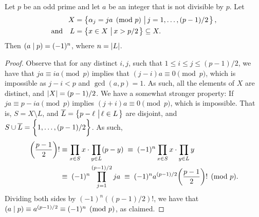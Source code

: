 \begin{lemma}
    Let $p$ be an odd prime and let $a$ be an integer that is not
    divisible by $p$. Let
    \begin{align*}
        X &= \left\{ { \alpha_ j = ja
           \pmod{p}\,\left|\, {j=1,\ldots, (p-1)/2} \bigr.\right.} \right\},\\
        \text{and}\quad
        L &= { \left\{ { x \in X \,\left|\, { x > p/2} \bigr.\right.} \right\} } \subseteq X.
    \end{align*}
    Then $\left( \displaystyle {a}\mid{p} \right) = (-1)^n$, where $n = \left| {L} \right|$.
\end{lemma}
\begin{proof}
    Observe that for any distinct $i,j$, such that $1\leq i\leq j\leq
    (p-1)/2$, we have that $ja \equiv ia \pmod{p}$ implies that $(j-i)
    a \equiv 0 \pmod{p}$, which is impossible as $j-i < p$ and
    $\gcd(a,p) = 1$. As such, all the elements of $X$ are distinct,
    and $\left| {X} \right| = (p-1)/2$. We have a somewhat stronger property:
    If $ja \equiv p - ia \pmod{p}$ implies $(j+i)a \equiv 0 \pmod{p}$,
    which is impossible. That is, $S =X \setminus L$, and
    $\overline{L} = \left\{ { p -\ell \,\left|\, {\ell \in L} \bigr.\right.} \right\}$ are disjoint, and
    $S \cup \overline{L} = \left\{ {1,\ldots, (p-1)/2\biggl.} \right\}$. As such,
    \begin{align*} 
        \pth{\frac{p-1}{2}}!%
        &\equiv%
        \prod_{x \in S} x \cdot \prod_{y \in L} (p-y)%
        \;\equiv\;%
        (-1)^n \prod_{x \in S} x \cdot \prod_{y \in L} y\\
        &\equiv\;%
        (-1)^n \prod_{j=1}^{(p-1)/2} j a%
        \;\equiv\;%
        (-1)^n a^{(p-1)/2} \pth[]{\frac{p-1}{2}}! %
        \pmod{p}.
    \end{align*}
    Dividing both sides by $(-1)^n((p-1)/2)!$, we have that
    $\left( \displaystyle {a}\mid{p} \right) \equiv a^{(p-1)/2} \equiv (-1)^n \pmod{p}$, as
    claimed.
\end{proof}


